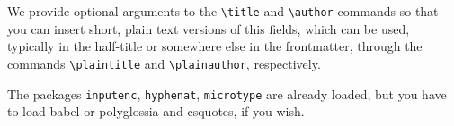 We provide optional arguments to the \verb|\title| and \verb|\author| 
commands so that you can insert short, plain text versions of this 
fields, which can be used, typically in the half-title or somewhere else 
in the frontmatter, through the commands \verb|\plaintitle| and 
\verb|\plainauthor|, respectively.


The packages \verb|inputenc|, \verb|hyphenat|, \verb|microtype| are 
already loaded, but you have to load babel or polyglossia and csquotes, 
if you wish.
